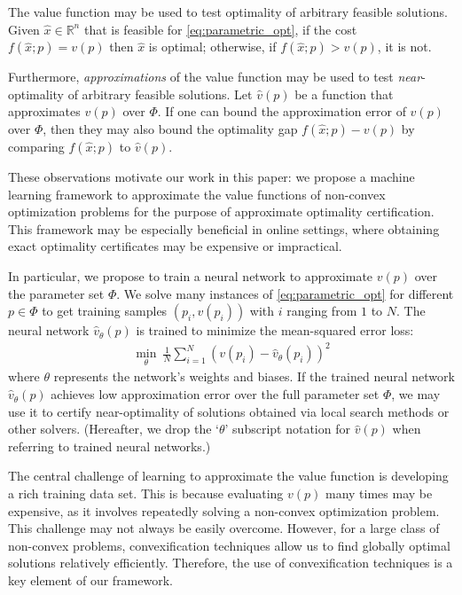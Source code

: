 \documentclass[10pt]{article} %
\theoremstyle{plain}
\theoremstyle{definition}
\theoremstyle{remark}
\begin{document}
The value function may be used to test optimality of arbitrary feasible solutions. Given $\hat{x} \in \mathbb{R}^n$ that is feasible for \eqref{eq:parametric_opt}, if the cost $f(\hat{x};p) = v(p)$ then $\hat{x}$ is optimal; otherwise, if $f(\hat{x};p) > v(p)$, it is not.

Furthermore, \textit{approximations} of the value function may be used to test \textit{near}-optimality of arbitrary feasible solutions. Let $\hat{v}(p)$ be a function that approximates $v(p)$ over $\Phi$. If one can bound the approximation error of $\hat{v}(p)$ over $\Phi$, then they may also bound the optimality gap $f(\hat{x};p) - v(p)$ by comparing $f(\hat{x};p)$ to $\hat{v}(p)$. 

These observations motivate our work in this paper: we propose a machine learning framework to approximate the value functions of non-convex optimization problems for the purpose of approximate optimality certification. This framework may be especially beneficial in online settings, where obtaining exact optimality certificates may be expensive or impractical.

In particular, we propose to train a neural network to approximate $v(p)$ over the parameter set $\Phi$. 
We solve many instances of \eqref{eq:parametric_opt} for different $p \in \Phi$ to get training samples $(p_i, v(p_i))$ with $i$ ranging from $1$ to $N$.
The neural network $\hat{v}_{\theta}(p)$ is trained to minimize the mean-squared error loss:
\vspace{-0.5em}
\setlength{\jot}{0pt}
\begin{align}
    \min_\theta~ \frac{1}{N} \sum_{i=1}^{N} (v(p_i) - \hat{v}_{\theta}(p_i))^2
    \label{eq:learning-problem}
\end{align}
where $\theta$ represents the network's weights and biases.
If the trained neural network $\hat{v}_\theta(p)$ achieves low approximation error over the full parameter set $\Phi$, we may use it to certify near-optimality of solutions obtained via local search methods or other solvers. (Hereafter, we drop the `$\theta$' subscript notation for $\hat{v}(p)$ when referring to trained neural networks.)

The central challenge of learning to approximate the value function is developing a rich training data set. This is because evaluating $v(p)$ many times may be expensive, as it involves repeatedly solving a non-convex optimization problem.
This challenge may not always be easily overcome. However, for a large class of non-convex problems, convexification techniques allow us to find globally optimal solutions relatively efficiently. Therefore, the use of convexification techniques is a key element of our framework.
\end{document}
